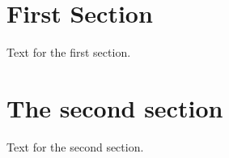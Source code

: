 \documentclass[a4paper]{article}
\begin{document}
\section{First Section}

Text for the first section.

\section{The second section}

Text for the second section.
\end{document}
